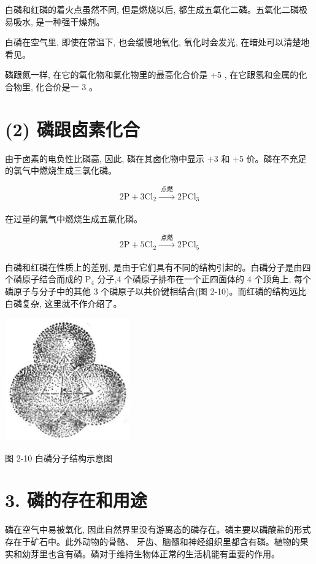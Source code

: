 \documentclass[10pt]{article}
\begin{document}
白磷和红磷的着火点虽然不同, 但是燃烧以后, 都生成五氧化二磷。五氧化二磷极易吸水, 是一种强干燥剂。

白磷在空气里, 即使在常温下, 也会缓慢地氧化, 氧化时会发光, 在暗处可以清楚地看见。

磷跟氮一样, 在它的氧化物和氯化物里的最高化合价是 +5 , 在它跟氢和金属的化合物里, 化合价是一 3 。

\section*{(2) 磷跟卤素化合}

由于卤素的电负性比磷高, 因此, 磷在其卤化物中显示 \(+ 3\) 和 +5 价。磷在不充足的氯气中燃烧生成三氯化磷。

\[
2\mathrm{P} + 3{\mathrm{{Cl}}}_{2}\xrightarrow[]{\text{ 点燃 }}2{\mathrm{{PCl}}}_{3}
\]

在过量的氯气中燃烧生成五氯化磷。

\[
2\mathrm{P} + 5{\mathrm{{Cl}}}_{2}\xrightarrow[]{\text{ 点燃 }}2{\mathrm{{PCl}}}_{5}
\]

白磷和红磷在性质上的差别, 是由于它们具有不同的结构引起的。白磷分子是由四个磷原子结合而成的 \({\mathrm{P}}_{4}\) 分子,4 个磷原子排布在一个正四面体的 4 个顶角上, 每个磷原子与分子中的其他 3 个磷原子以共价键相结合(图 2-10)。而红磷的结构远比白磷复杂, 这里就不作介绍了。

\begin{center}
\includegraphics[max width=0.4\textwidth]{images/01912d13-9986-7822-a012-3f3f7be99dcb_58_455439.jpg}
\end{center}

图 2-10 白磷分子结构示意图

\section*{3. 磷的存在和用途}

磷在空气中易被氧化, 因此自然界里没有游离态的磷存在。磷主要以磷酸盐的形式存在于矿石中。此外动物的骨骼、 牙齿、脑髓和神经组织里都含有磷。植物的果实和幼芽里也含有磷。磷对于维持生物体正常的生活机能有重要的作用。
\end{document}
